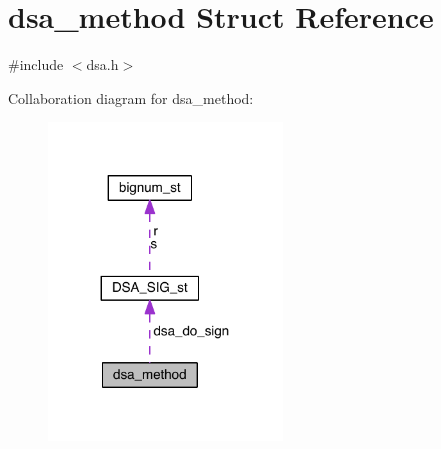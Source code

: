 \hypertarget{structdsa__method}{}\section{dsa\+\_\+method Struct Reference}
\label{structdsa__method}


{\ttfamily \#include $<$dsa.\+h$>$}



Collaboration diagram for dsa\+\_\+method\+:\nopagebreak
\begin{figure}[H]
\begin{center}
\leavevmode
\includegraphics[width=176pt]{structdsa__method__coll__graph}
\end{center}
\end{figure}
